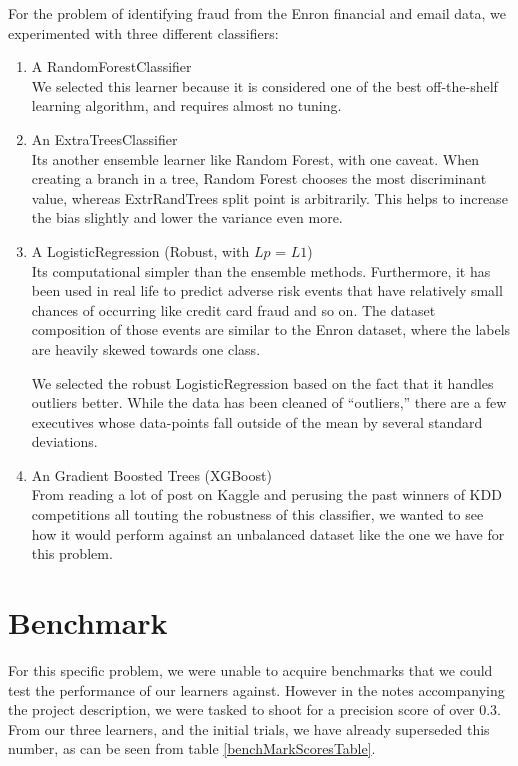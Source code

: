 \documentclass[twoside,openright,titlepage,numbers=noenddot,headinclude,%
               footinclude=true,cleardoublepage=empty,abstractoff,BCOR=5mm,%
               paper=a4,fontsize=11pt,ngerman,american]{scrreprt}
\numberwithin{theorem}{chapter}
\numberwithin{definition}{chapter}
\numberwithin{algorithm}{chapter}
\numberwithin{figure}{chapter}
\numberwithin{table}{chapter}
\numberwithin{equation}{chapter}
\begin{document}
For the problem of identifying fraud from the Enron financial and email data, we experimented with three different classifiers:
\begin{enumerate}%
\item A RandomForestClassifier\\
We selected this learner because it is considered one of the best off-the-shelf learning algorithm, and requires almost no tuning. 
\item An ExtraTreesClassifier\\
 Its another ensemble learner like Random Forest, with one caveat. When creating a branch in a tree, Random Forest chooses the most discriminant value, whereas ExtrRandTrees split point is arbitrarily. This helps to increase the bias slightly and lower the variance even more.
\item A LogisticRegression (Robust, with $Lp$ = $L1$) \\
Its computational simpler than the ensemble methods. Furthermore, it has been used in real life to predict adverse risk events that have relatively small chances of occurring like credit card fraud and so on. The dataset composition of those events are similar to the Enron dataset, where the labels are heavily skewed towards one class.

We selected the robust LogisticRegression based on the fact that it handles outliers better. While the data has been cleaned of ``outliers,'' there are a few executives whose data-points fall outside of the mean by several standard deviations.
\item An Gradient Boosted Trees (XGBoost)\\
From reading a lot of post on Kaggle and perusing the past winners of KDD competitions all touting the robustness of this classifier, we wanted to see how it would perform against an unbalanced dataset like the one we have for this problem.

\end{enumerate}



\section*{Benchmark}

For this specific problem, we were unable to acquire benchmarks that we could test the performance of our learners against. However in the notes accompanying the project description, we were tasked to shoot for a precision score of over 0.3. From our three learners, and the initial trials, we have already superseded this number, as can be seen from table \ref{benchMarkScoresTable}.
\end{document}
